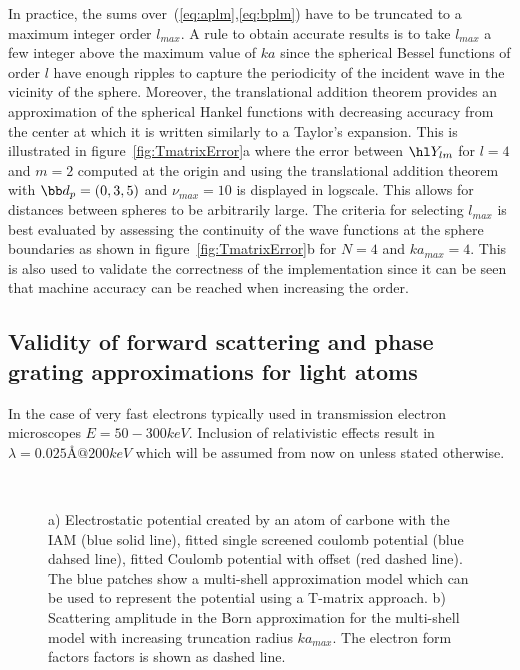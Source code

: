 In practice, the sums over~(\ref{eq:aplm},\ref{eq:bplm}) have to be truncated to
a maximum integer order $l_{max}$.
A rule to obtain accurate results is to take $l_{max}$ a few integer
above the maximum value of $ka$ since the spherical Bessel functions of
order $l$ have enough ripples to capture the periodicity of the incident wave
in the vicinity of the sphere. Moreover, the translational addition theorem
provides an approximation of the spherical Hankel functions with decreasing
accuracy from the center at which it is written similarly to a Taylor's expansion.
This is illustrated in figure~\ref{fig:TmatrixError}a where the error between
$\hl Y_{lm}$ for $l=4$ and $m=2$ computed at the origin and using the
translational addition theorem with $\bb d_p = (0,3,5)$ and $\nu_{max}=10$ is
displayed in logscale. This allows for distances between spheres to be arbitrarily large.
The criteria for selecting $l_{max}$ is best evaluated by assessing the
continuity of the wave functions at the sphere boundaries as shown in
figure~\ref{fig:TmatrixError}b for $N=4$ and $ka_{max}=4$.
This is also used to validate the correctness of the implementation
since it can be seen that machine accuracy can be reached when increasing
the order.



\subsection{Validity of forward scattering and phase grating approximations
 for light atoms}



In the case of very fast electrons typically used in transmission electron
microscopes $E=50-300keV$. Inclusion of relativistic effects result in
$\lambda=0.025\text{\AA}@200keV$ which will be assumed from now on unless stated
otherwise.

\begin{figure}[h!]
  \centering
  \\
  \vspace{-2em}
\caption{
a) Electrostatic potential created by an atom of carbone with
the IAM (blue solid line),
fitted single screened coulomb potential (blue dahsed line),
fitted Coulomb potential with offset (red dashed line).
The blue patches show a multi-shell approximation model which can be used
to represent the potential using a T-matrix approach.
b) Scattering amplitude in the Born approximation for the multi-shell model
with increasing truncation radius $ka_{max}$. The electron form factors factors
is shown as dashed line.
}\label{fig:IAM}
\end{figure}

